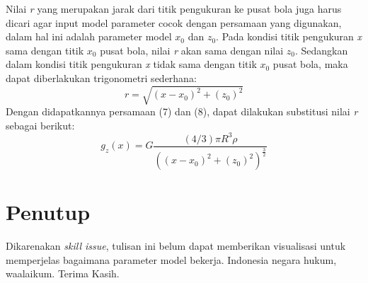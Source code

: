 \documentclass{article}
\begin{document}
Nilai \textit{r} yang merupakan jarak dari titik pengukuran ke pusat bola juga harus dicari agar input model parameter cocok dengan persamaan yang digunakan, dalam hal ini adalah parameter model $x_0$ dan $z_0$. Pada kondisi titik pengukuran \textit{x} sama dengan titik $x_0$ pusat bola, nilai \textit{r} akan sama dengan nilai $z_0$. Sedangkan dalam kondisi titik pengukuran \textit{x} tidak sama dengan titik $x_0$ pusat bola, maka dapat diberlakukan trigonometri sederhana:
\begin{equation}
    r = \sqrt{(x-x_0)^2 + (z_0)^2}
\end{equation}
Dengan didapatkannya persamaan (7) dan (8), dapat dilakukan substitusi nilai \textit{r} sebagai berikut:
\begin{equation}
    g_z(x)=G \frac{(4/3) \pi R^3 \rho}{((x-x_0)^2 + (z_0)^2)^\frac{3}{2}}
\end{equation}

\section{Penutup}
Dikarenakan \textit{skill issue}, tulisan ini belum dapat memberikan visualisasi untuk memperjelas bagaimana parameter model bekerja. Indonesia negara hukum, waalaikum. Terima Kasih. 
\end{document}

